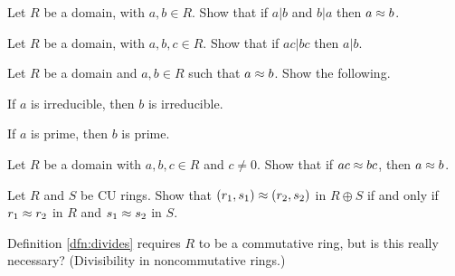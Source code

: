 \begin{exercise}
Let \(R\) be a domain, with \(a,b \in R\). Show that if \(a|b\) and \(b|a\) then \(a \approx b\).
\end{exercise}

\begin{exercise}
Let \(R\) be a domain, with \(a,b,c \in R\). Show that if \(ac|bc\) then \(a|b\).
\end{exercise}

\begin{exercise}
Let \(R\) be a domain and \(a,b \in R\) such that \(a \approx b\). Show the following.
\begin{proplist*}
\item If \(a\) is irreducible, then \(b\) is irreducible.
\item If \(a\) is prime, then \(b\) is prime.
\end{proplist*}
\end{exercise}

\begin{exercise}
Let \(R\) be a domain with \(a,b,c \in R\) and \(c \neq 0\). Show that if \(ac \approx bc\), then \(a \approx b\).
\end{exercise}

\begin{exercise}
Let \(R\) and \(S\) be CU rings. Show that \((r_1,s_1) \approx (r_2,s_2)\) in \(R \oplus S\) if and only if \(r_1 \approx r_2\) in \(R\) and \(s_1 \approx s_2\) in \(S\).
\end{exercise}

\begin{exercise}
Definition \ref{dfn:divides} requires \(R\) to be a commutative ring, but is this really necessary? (Divisibility in noncommutative rings.)
\end{exercise}
